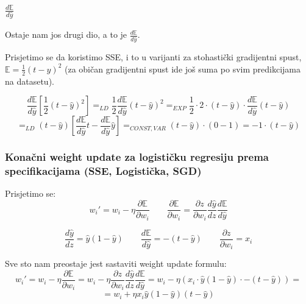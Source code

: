 \documentclass{beamer}
\begin{document}
\begin{frame}
\frametitle{$\frac{d\mathbb{E}}{d\hat{y}}$}
Ostaje nam jos drugi dio, a to je $\frac{d\mathbb{E}}{d\hat{y}}$.\pause

Prisjetimo se da koristimo SSE, i to u varijanti za stohasti\v cki gradijentni spust, $\mathbb{E}=\frac{1}{2}(t-y)^2$ (za obi\v can gradijentni spust ide jo\v s suma po svim predikcijama na datasetu).\pause

$$\frac{d\mathbb{E}}{d\hat{y}} [\frac{1}{2}(t-\hat{y})^2] =_{LD}  \frac{1}{2}\frac{d\mathbb{E}}{d\hat{y}}(t-\hat{y})^2 =_{EXP} \frac{1}{2}\cdot 2 \cdot (t-\hat{y}) \cdot \frac{d\mathbb{E}}{d\hat{y}}(t-\hat{y})$$ 
$$=_{LD} (t-\hat{y}) [\frac{d\mathbb{E}}{d\hat{y}}t - \frac{d\mathbb{E}}{d\hat{y}}\hat{y}] =_{CONST,VAR} (t-\hat{y}) \cdot (0-1)= -1\cdot (t-\hat{y})  $$


\end{frame}

\begin{frame}
\frametitle{Kona\v cni weight update za logisti\v cku regresiju prema specifikacijama (SSE, Logisti\v cka, SGD)}
Prisjetimo se:
$$w_i'=w_i-\eta\frac{\partial\mathbb{E}}{\partial w_i} \qquad \frac{\partial \mathbb{E}}{\partial w_i}= \frac{\partial z}{\partial w_i} \frac{d \hat{y}}{d z} \frac{d \mathbb{E}}{d\hat{y}}$$\pause


$$\frac{d\hat{y}}{dz}=\hat{y}(1-\hat{y}) \qquad \frac{d\mathbb{E}}{d\hat{y}}=-(t-\hat{y}) \qquad \frac{\partial z}{\partial w_i}=x_i$$\pause

Sve sto nam preostaje jest sastaviti weight update formulu:
$$w_i'=w_i-\eta\frac{\partial \mathbb{E}}{\partial w_i}= w_i -\eta\frac{\partial z}{\partial w_i} \frac{d \hat{y}}{d z} \frac{d \mathbb{E}}{d\hat{y}}= w_i-\eta (x_i \cdot \hat{y}(1-\hat{y})\cdot -(t-\hat{y}))=$$
$$=w_i+\eta x_i \hat{y} (1-\hat{y})(t-\hat{y})$$

\end{frame}
\end{document}
